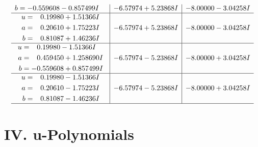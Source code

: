 \documentclass[1p]{elsarticle_modified}
\theoremstyle{definition}
\begin{document}
$$\begin{array}{c|c|c}
\begin{aligned}
b &= -0.559608 - 0.857499 I\end{aligned}
 & -6.57974 + 5.23868 I & -8.00000 - 3.04258 I \\ \hline\begin{aligned}
u &= \phantom{-}0.19980 + 1.51366 I \\
a &= \phantom{-}0.20610 + 1.75223 I \\
b &= \phantom{-}0.81087 + 1.46236 I\end{aligned}
 & -6.57974 + 5.23868 I & -8.00000 - 3.04258 I \\ \hline\begin{aligned}
u &= \phantom{-}0.19980 - 1.51366 I \\
a &= \phantom{-}0.459450 + 1.258690 I \\
b &= -0.559608 + 0.857499 I\end{aligned}
 & -6.57974 - 5.23868 I & -8.00000 + 3.04258 I \\ \hline\begin{aligned}
u &= \phantom{-}0.19980 - 1.51366 I \\
a &= \phantom{-}0.20610 - 1.75223 I \\
b &= \phantom{-}0.81087 - 1.46236 I\end{aligned}
 & -6.57974 - 5.23868 I & -8.00000 + 3.04258 I\\
 \hline 
 \end{array}$$\newpage
\newpage\renewcommand{\arraystretch}{1}
\centering \section*{ IV. u-Polynomials}
\end{document}
